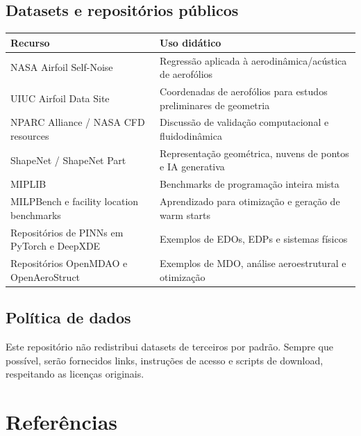 \documentclass[
  brazilian,
  a4paper,
  DIV=11,
  numbers=noendperiod]{scrreprt}
\newcounter{none} %
\begin{document}
\section{Datasets e repositórios
públicos}\label{datasets-e-reposituxf3rios-puxfablicos}

{\def\LTcaptype{none} %
\begin{longtable}[]{@{}
  >{\raggedright\arraybackslash}p{}
  >{\raggedright\arraybackslash}p{}@{}}
\toprule\noalign{}
\begin{minipage}[b]{\linewidth}\raggedright
Recurso
\end{minipage} & \begin{minipage}[b]{\linewidth}\raggedright
Uso didático
\end{minipage} \\
\midrule\noalign{}
\endhead
\bottomrule\noalign{}
\endlastfoot
NASA Airfoil Self-Noise & Regressão aplicada à aerodinâmica/acústica de
aerofólios \\
UIUC Airfoil Data Site & Coordenadas de aerofólios para estudos
preliminares de geometria \\
NPARC Alliance / NASA CFD resources & Discussão de validação
computacional e fluidodinâmica \\
ShapeNet / ShapeNet Part & Representação geométrica, nuvens de pontos e
IA generativa \\
MIPLIB & Benchmarks de programação inteira mista \\
MILPBench e facility location benchmarks & Aprendizado para otimização e
geração de warm starts \\
Repositórios de PINNs em PyTorch e DeepXDE & Exemplos de EDOs, EDPs e
sistemas físicos \\
Repositórios OpenMDAO e OpenAeroStruct & Exemplos de MDO, análise
aeroestrutural e otimização \\
\end{longtable}
}

\section{Política de dados}\label{poluxedtica-de-dados}

Este repositório não redistribui datasets de terceiros por padrão.
Sempre que possível, serão fornecidos links, instruções de acesso e
scripts de download, respeitando as licenças originais.

\chapter{Referências}\label{referuxeancias}
\end{document}
